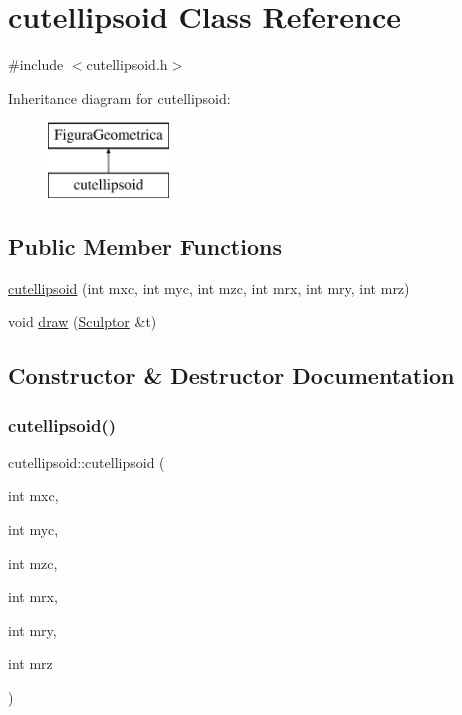 \hypertarget{classcutellipsoid}{}\section{cutellipsoid Class Reference}
\label{classcutellipsoid}


{\ttfamily \#include $<$cutellipsoid.\+h$>$}

Inheritance diagram for cutellipsoid\+:\begin{figure}[H]
\begin{center}
\leavevmode
\includegraphics[height=2.000000cm]{classcutellipsoid}
\end{center}
\end{figure}
\subsection*{Public Member Functions}
\begin{DoxyCompactItemize}
\item 
\mbox{\hyperlink{classcutellipsoid_a47c267101d2a8a1128f29d8308c176e9}{cutellipsoid}} (int mxc, int myc, int mzc, int mrx, int mry, int mrz)
\item 
void \mbox{\hyperlink{classcutellipsoid_a932dbc381691f5b42c7062c6699c7867}{draw}} (\mbox{\hyperlink{class_sculptor}{Sculptor}} \&t)
\end{DoxyCompactItemize}


\subsection{Constructor \& Destructor Documentation}
\mbox{\label{classcutellipsoid_a47c267101d2a8a1128f29d8308c176e9}} 
\subsubsection{\texorpdfstring{cutellipsoid()}{cutellipsoid()}}
{\footnotesize\ttfamily cutellipsoid\+::cutellipsoid (\begin{DoxyParamCaption}\item[{int}]{mxc,  }\item[{int}]{myc,  }\item[{int}]{mzc,  }\item[{int}]{mrx,  }\item[{int}]{mry,  }\item[{int}]{mrz }\end{DoxyParamCaption})}



